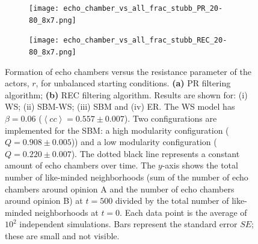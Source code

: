 \documentclass[11 pt , letterpaper , twoside , openright]{book}
\begin{document}
\begin{figure}[H]
  \begin{subfigure}[b]{0.49\textwidth}
    \caption{}
  	\texttt{[image: echo\_chamber\_vs\_all\_frac\_stubb\_PR\_20-80\_8x7.png]}
    \label{PR_all_frac_stubb_20-80}
  \end{subfigure}
  \begin{subfigure}[b]{0.49\textwidth}
    \caption{}
  	\texttt{[image: echo\_chamber\_vs\_all\_frac\_stubb\_REC\_20-80\_8x7.png]}
    \label{REC_all_frac_stubb_20-80}
  \end{subfigure}
  \captionsetup{format=plain}
  \caption[Formation of echo chambers versus the resistance parameter of the actors, $r$, for unbalanced starting conditions. The PR and REC filtering algorithms are used.]{Formation of echo chambers versus the resistance parameter of the actors, $r$, for unbalanced starting conditions. \textbf{(a)} PR filtering algorithm; \textbf{(b)} REC filtering algorithm. Results are shown for: (i) WS; (ii) SBM-WS; (iii) SBM and (iv) ER. The WS model has $\beta = 0.06$ ($\left<cc\right> = 0.557 \pm 0.007$). Two configurations are implemented for the SBM: a high modularity configuration ($Q = 0.908 \pm 0.005$)) and a low modularity configuration ($Q = 0.220 \pm 0.007$). The dotted black line represents a constant amount of echo chambers over time. The $y$-axis shows the total number of like-minded neighborhoods (sum of the number of echo chambers around opinion A and the number of echo chambers around opinion B) at $t=500$ divided by the total number of like-minded neighborhoods at $t=0$. Each data point is the average of $10^2$ independent simulations. Bars represent the standard error $SE$; these are small and not visible.}
\label{echo_vs_all_frac_stubb_PR-REC_20-80}
\end{figure}
\noindent
\end{document}
